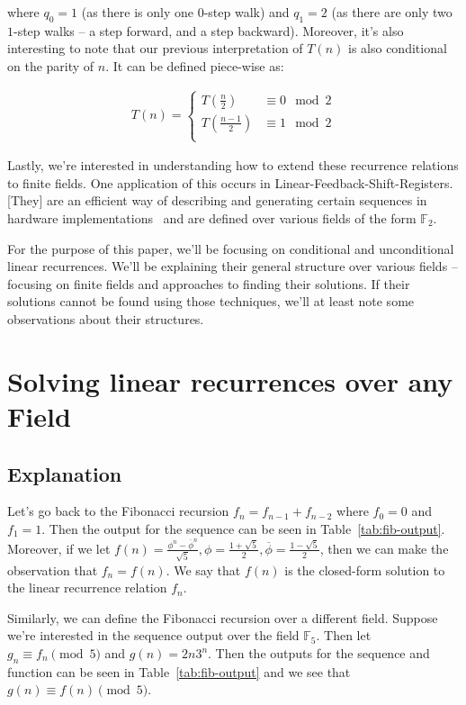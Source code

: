 \documentclass[a4paper]{article}
\theoremstyle{definition}
\begin{document}
where $q_0=1$ (as there is only one $0$-step walk) and $q_1=2$ (as there are only two $1$-step walks --
a step forward, and a step backward). Moreover, it's also interesting to note that our previous
interpretation of $T(n)$ is also conditional on the parity of $n$. It can be defined piece-wise as:

\begin{align*}
T(n)=
\begin{cases}
T\left(\frac{n  }{2}\right) & \equiv 0 \mod 2 \\
T\left(\frac{n-1}{2}\right) & \equiv 1 \mod 2 \\
\end{cases}
\end{align*}

Lastly, we're interested in understanding how to extend these recurrence relations to finite fields. One
application of this occurs in Linear-Feedback-Shift-Registers. [They] are an efficient way of describing
and generating certain sequences in hardware implementations~\cite{bib:lfsr} and are defined over
various fields of the form $\mathbb{F}_{2}$.  

For the purpose of this paper, we'll be focusing on conditional and unconditional linear recurrences.
We'll be explaining their general structure over various fields -- focusing on finite fields and
approaches to finding their solutions. If their solutions cannot be found using those techniques, we'll
at least note some observations about their structures.

\section{Solving linear recurrences over any Field}

\subsection{Explanation}
Let's go back to the Fibonacci recursion $f_n=f_{n-1}+f_{n-2}$ where $f_0=0$ and $f_1=1$. Then the
output for the sequence can be seen in Table~\ref{tab:fib-output}. Moreover, if we let
$f(n)=\frac{\phi^n-\overline{\phi}^n}{\sqrt{5}}, \phi=\frac{1+\sqrt{5}}{2}, \overline{\phi}=\frac{1-\sqrt{5}}{2}$,
then we can make the observation that $f_n=f(n)$. We say that $f(n)$ is the closed-form solution to the
linear recurrence relation $f_n$. 

Similarly, we can define the Fibonacci recursion over a different field. Suppose we're interested in the
sequence output over the field $\mathbb{F}_5$. Then let $g_n \equiv f_n \pmod 5$ and $g(n)=2n3^n$. Then
the outputs for the sequence and function can be seen in Table~\ref{tab:fib-output} and we see that
$g(n) \equiv f(n) \pmod 5$.
\end{document}
